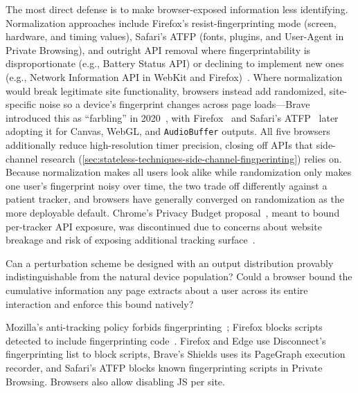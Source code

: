 %
The most direct defense is to make browser-exposed information less identifying.
%
Normalization approaches include Firefox's resist-fingerprinting mode (screen, hardware, and timing values), Safari's ATFP (fonts, plugins, and User-Agent in Private Browsing), and outright API removal where fingerprintability is disproportionate (e.g., Battery Status API) or declining to implement new ones (e.g., Network Information API in WebKit and Firefox)~\cite{TrackingPreventionWebKit2020}.
%
Where normalization would break legitimate site functionality, browsers instead add randomized, site-specific noise so a device's fingerprint changes across page loads---Brave introduced this as ``farbling'' in 2020~\cite{braveprivacyteamFingerprintingDefenses202020}, with Firefox~\cite{huang1816056FprandomizationMeta2023} and Safari's ATFP~\cite{wilanderPrivateBrowsing202024} later adopting it for Canvas, WebGL, and \texttt{AudioBuffer} outputs.
%
All five browsers additionally reduce high-resolution timer precision, closing off APIs that side-channel research (\autoref{sec:stateless-techniques-side-channel-fingperinting}) relies on.
%
Because normalization makes all users look alike while randomization only makes one user's fingerprint noisy over time, the two trade off differently against a patient tracker, and browsers have generally converged on randomization as the more deployable default.
%
Chrome's Privacy Budget proposal~\cite{lasseyMikewestPrivacybudget2019}, meant to bound per-tracker API exposure, was discontinued due to concerns about website breakage and risk of exposing additional tracking surface~\cite{snyderBraveFingerprintingPrivacy2019,rescorlaTechnicalCommentsPrivacy2021,leflerWhatHappenedPrivacy2024}.


\begin{opbox}
Can a perturbation scheme be designed with an output distribution provably indistinguishable from the natural device population?
%
%
Could a browser bound the cumulative information any page extracts about a user across its entire interaction and enforce this bound natively?
\end{opbox}


%
Mozilla's anti-tracking policy forbids fingerprinting~\cite{mozillaSecurityTrackingPolicy2019}; Firefox blocks scripts detected to include fingerprinting code~\cite{englehardtFirefox72Blocks2020}. 
%
Firefox and Edge use Disconnect's fingerprinting list to block scripts, Brave's Shields uses its PageGraph execution recorder, and Safari's ATFP blocks known fingerprinting scripts in Private Browsing.
%
Browsers also allow disabling JS per site.



